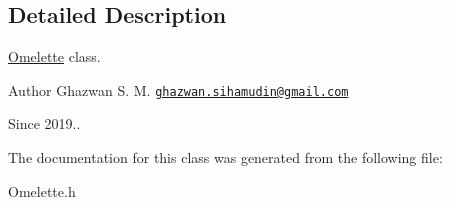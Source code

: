 \subsection{Detailed Description}
\hyperlink{classOmelette}{Omelette} class.

\begin{DoxyAuthor}{Author}
Ghazwan S. M. \href{mailto:ghazwan.sihamudin@gmail.com}{\tt ghazwan.\+sihamudin@gmail.\+com} 
\end{DoxyAuthor}
\begin{DoxySince}{Since}
2019.. 
\end{DoxySince}


The documentation for this class was generated from the following file\+:\begin{DoxyCompactItemize}
\item 
Omelette.\+h\end{DoxyCompactItemize}
